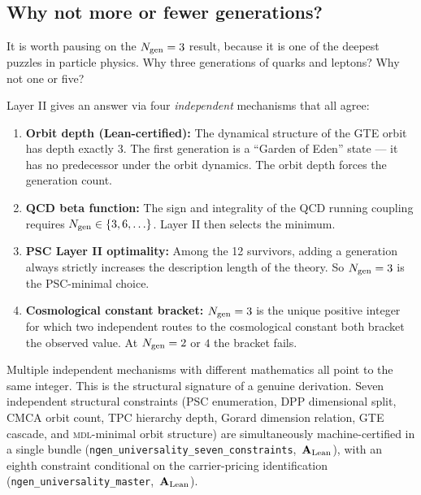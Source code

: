 \documentclass[11pt,a4paper]{article}
\newcommand{\MDL}{\textsc{mdl}}
\newcommand{\lean}[1]{\texttt{#1}}
\newcommand{\CatAL}{\ensuremath{\mathbf{A}_{\rm Lean}}}
\begin{document}
\subsection{Why not more or fewer generations?}

It is worth pausing on the $N_{\rm gen} = 3$ result, because it is one of the
deepest puzzles in particle physics.  Why three generations of quarks and leptons?
Why not one or five?

Layer II gives an answer via four \emph{independent} mechanisms that all agree:

\begin{enumerate}[leftmargin=2em,itemsep=6pt]
\item \textbf{Orbit depth (Lean-certified):}
The dynamical structure of the GTE orbit has depth exactly 3.
The first generation is a ``Garden of Eden'' state — it has no predecessor under
the orbit dynamics.  The orbit depth forces the generation count.

\item \textbf{QCD beta function:}
The sign and integrality of the QCD running coupling requires $N_{\rm gen} \in \{3, 6, \ldots\}$.
Layer II then selects the minimum.

\item \textbf{PSC Layer II optimality:}
Among the 12 survivors, adding a generation always strictly increases the
description length of the theory.  So $N_{\rm gen} = 3$ is the PSC-minimal choice.

\item \textbf{Cosmological constant bracket:}
$N_{\rm gen} = 3$ is the unique positive integer for which two independent routes
to the cosmological constant both bracket the observed value.
At $N_{\rm gen} = 2$ or $4$ the bracket fails.
\end{enumerate}

\begin{tcolorbox}[colback=boxblue,colframe=blue!40!black,
  title={Remark: convergence, not coincidence}]
Multiple independent mechanisms with different mathematics all point to the same integer.
This is the structural signature of a genuine derivation.
Seven independent structural constraints (PSC enumeration, DPP dimensional split,
CMCA orbit count, TPC hierarchy depth, Gorard dimension relation, GTE cascade, and
\MDL-minimal orbit structure) are simultaneously machine-certified in a single bundle
\mbox{(\lean{ngen\_universality\_seven\_constraints}, \CatAL)}, with an eighth
constraint conditional on the carrier-pricing identification
\mbox{(\lean{ngen\_universality\_master}, \CatAL)}.
\end{tcolorbox}
\end{document}
